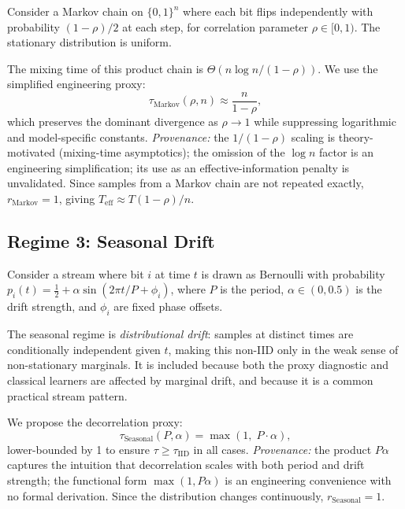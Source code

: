 \documentclass[sensors,article,submit,pdftex,moreauthors]{Definitions/mdpi}
\newcommand{\Teff}{T_{\mathrm{eff}}}
\providecommand{\DIFadd}[1]{{\protect\color{blue}#1}} %
\providecommand{\DIFdel}[1]{} %
\providecommand{\DIFaddbegin}{} %
\providecommand{\DIFaddend}{} %
\providecommand{\DIFdelbegin}{} %
\providecommand{\DIFdelend}{} %
\begin{document}
Consider a Markov chain on $\{0,1\}^n$ where each bit flips independently with probability $(1 - \rho)/2$ at each step, for correlation parameter $\rho \in [0, 1)$. The stationary distribution is uniform.

The mixing time of this product chain is $\Theta(n \log n / (1 - \rho))$. We use the simplified engineering proxy:
\begin{equation}
    \tau_{\text{Markov}}(\rho, n) \approx \frac{n}{1 - \rho},
    \label{eq:tau_markov}
\end{equation}
which preserves the dominant divergence as $\rho \to 1$ while suppressing logarithmic and model-specific constants. \emph{Provenance:} the $1/(1{-}\rho)$ scaling is theory-motivated (mixing-time asymptotics); the omission of the $\log n$ factor is an engineering simplification; \DIFdelbegin \DIFdel{the equivalence to the exact framework's correlation parameters }\DIFdelend \DIFaddbegin \DIFadd{its use as an effective-information penalty }\DIFaddend is unvalidated. Since samples from a Markov chain are not repeated exactly, $r_{\text{Markov}} = 1$, giving $\Teff \approx T(1{-}\rho)/n$.

\subsection{Regime 3: Seasonal Drift}

Consider a stream where bit $i$ at time $t$ is drawn as Bernoulli with probability $p_i(t) = \tfrac{1}{2} + \alpha \sin(2\pi t/P + \phi_i)$, where $P$ is the period, $\alpha \in (0, 0.5)$ is the drift strength, and $\phi_i$ are fixed phase offsets.

The seasonal regime is \emph{distributional drift}: samples at distinct times are conditionally independent given $t$, making this non\nobreakdash-IID only in the weak sense of non-stationary marginals. It is included because both the \DIFdelbegin \DIFdel{quantum oracle construction }\DIFdelend \DIFaddbegin \DIFadd{proxy diagnostic }\DIFaddend and classical learners are affected by marginal drift, and because it is a common practical stream pattern.

We propose the decorrelation proxy:
\begin{equation}
    \tau_{\text{Seasonal}}(P, \alpha) = \max(1,\; P \cdot \alpha),
    \label{eq:tau_seasonal}
\end{equation}
lower-bounded by 1 to ensure $\tau \geq \tau_{\text{IID}}$ in all cases. \emph{Provenance:} the product $P\alpha$ captures the intuition that decorrelation scales with both period and drift strength; the functional form $\max(1, P\alpha)$ is an engineering convenience with no formal derivation. Since the distribution changes continuously, $r_{\text{Seasonal}} = 1$.
\end{document}
